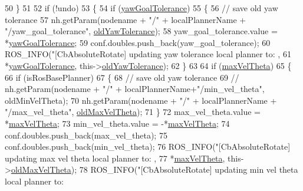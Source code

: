 \begin{DoxyCode}
50   \}
51 
52   \textcolor{keywordflow}{if} (!undo)
53   \{
54     \textcolor{keywordflow}{if} (\hyperlink{classcl__move__base__z_1_1CbAbsoluteRotate_a8d8b5b9c2c821efe101bb07c96c4bdd3}{yawGoalTolerance})
55     \{
56       \textcolor{comment}{// save old yaw tolerance}
57       nh.getParam(nodename + \textcolor{stringliteral}{"/"} + localPlannerName + \textcolor{stringliteral}{"/yaw\_goal\_tolerance"}, 
      \hyperlink{classcl__move__base__z_1_1CbAbsoluteRotate_a2cfcd2978e7923494e2e66107e134e27}{oldYawTolerance});
58       yaw\_goal\_tolerance.value = *\hyperlink{classcl__move__base__z_1_1CbAbsoluteRotate_a8d8b5b9c2c821efe101bb07c96c4bdd3}{yawGoalTolerance};
59       conf.doubles.push\_back(yaw\_goal\_tolerance);
60       ROS\_INFO(\textcolor{stringliteral}{"[CbAbsoluteRotate] updating yaw tolerance local planner to: %
      ,
61                *\hyperlink{classcl__move__base__z_1_1CbAbsoluteRotate_a8d8b5b9c2c821efe101bb07c96c4bdd3}{yawGoalTolerance}, this->\hyperlink{classcl__move__base__z_1_1CbAbsoluteRotate_a2cfcd2978e7923494e2e66107e134e27}{oldYawTolerance});
62     \}
63 
64     \textcolor{keywordflow}{if} (\hyperlink{classcl__move__base__z_1_1CbAbsoluteRotate_ac0018b01a202dd805e3d3b50ed205d23}{maxVelTheta})
65     \{
66       \textcolor{keywordflow}{if} (isRosBasePlanner)
67       \{
68         \textcolor{comment}{// save old yaw tolerance}
69         \textcolor{comment}{// nh.getParam(nodename + "/"  + localPlannerName+"/min\_vel\_theta", oldMinVelTheta);}
70         nh.getParam(nodename + \textcolor{stringliteral}{"/"} + localPlannerName + \textcolor{stringliteral}{"/max\_vel\_theta"}, 
      \hyperlink{classcl__move__base__z_1_1CbAbsoluteRotate_a131095d57ad3fd423bb9eaebebf61cc9}{oldMaxVelTheta});
71       \}
72       max\_vel\_theta.value = *\hyperlink{classcl__move__base__z_1_1CbAbsoluteRotate_ac0018b01a202dd805e3d3b50ed205d23}{maxVelTheta};
73       min\_vel\_theta.value = -*\hyperlink{classcl__move__base__z_1_1CbAbsoluteRotate_ac0018b01a202dd805e3d3b50ed205d23}{maxVelTheta};
74       conf.doubles.push\_back(max\_vel\_theta);
75       conf.doubles.push\_back(min\_vel\_theta);
76       ROS\_INFO(\textcolor{stringliteral}{"[CbAbsoluteRotate] updating max vel theta local planner to: %
      ,
77                *\hyperlink{classcl__move__base__z_1_1CbAbsoluteRotate_ac0018b01a202dd805e3d3b50ed205d23}{maxVelTheta}, this->\hyperlink{classcl__move__base__z_1_1CbAbsoluteRotate_a131095d57ad3fd423bb9eaebebf61cc9}{oldMaxVelTheta});
78       ROS\_INFO(\textcolor{stringliteral}{"[CbAbsoluteRotate] updating min vel theta local planner to: %
}}}
\end{DoxyCode}
